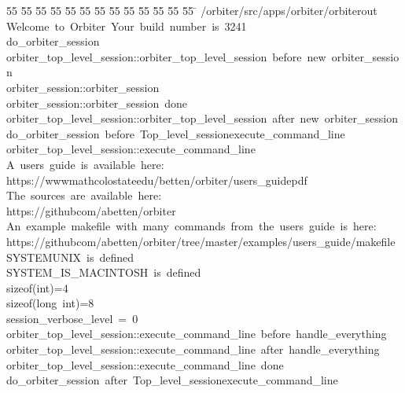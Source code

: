 %
%
\begin{tabbing}
55 \= 55 \= 55 \= 55 \= 55 \= 55 \= 55 \= 55 \= 55 \= 55 \= 55 \= 55 \= 55 \= \kill
{}/orbiter/src/apps/orbiter/orbiterout\\[0pt]
Welcome\ to\ Orbiter\ Your\ build\ number\ is\ 3241\\[0pt]
do\_orbiter\_session\\[0pt]
orbiter\_top\_level\_session::orbiter\_top\_level\_session\ before\ new\ orbiter\_session\\[0pt]
orbiter\_session::orbiter\_session\\[0pt]
orbiter\_session::orbiter\_session\ done\\[0pt]
orbiter\_top\_level\_session::orbiter\_top\_level\_session\ after\ new\ orbiter\_session\\[0pt]
do\_orbiter\_session\ before\ Top\_level\_sessionexecute\_command\_line\\[0pt]
orbiter\_top\_level\_session::execute\_command\_line\\[0pt]
A\ users\ guide\ is\ available\ here:\ \\[0pt]
https://wwwmathcolostateedu/betten/orbiter/users\_guidepdf\\[0pt]
The\ sources\ are\ available\ here:\ \\[0pt]
https://githubcom/abetten/orbiter\\[0pt]
An\ example\ makefile\ with\ many\ commands\ from\ the\ users\ guide\ is\ here:\ \\[0pt]
https://githubcom/abetten/orbiter/tree/master/examples/users\_guide/makefile\\[0pt]
SYSTEMUNIX\ is\ defined\\[0pt]
SYSTEM\_IS\_MACINTOSH\ is\ defined\\[0pt]
sizeof(int)=4\\[0pt]
sizeof(long\ int)=8\\[0pt]
session\_verbose\_level\ =\ 0\\[0pt]
orbiter\_top\_level\_session::execute\_command\_line\ before\ handle\_everything\\[0pt]
orbiter\_top\_level\_session::execute\_command\_line\ after\ handle\_everything\\[0pt]
orbiter\_top\_level\_session::execute\_command\_line\ done\\[0pt]
do\_orbiter\_session\ after\ Top\_level\_sessionexecute\_command\_line\\[0pt]

\end{tabbing}
